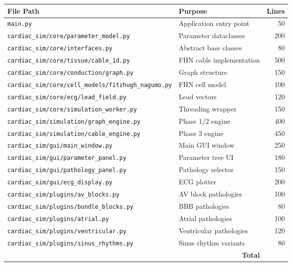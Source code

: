 \documentclass[12pt,a4paper,oneside]{book}
\begin{document}
\begin{center}
\begin{longtable}{|l|l|r|}
\hline
\textbf{File Path} & \textbf{Purpose} & \textbf{Lines} \\
\hline
\endhead
\hline
\endfoot
\texttt{main.py} & Application entry point & 50 \\
\texttt{cardiac\_sim/core/parameter\_model.py} & Parameter dataclasses & 200 \\
\texttt{cardiac\_sim/core/interfaces.py} & Abstract base classes & 80 \\
\texttt{cardiac\_sim/core/tissue/cable\_1d.py} & FHN cable implementation & 500 \\
\texttt{cardiac\_sim/core/conduction/graph.py} & Graph structure & 150 \\
\texttt{cardiac\_sim/core/cell\_models/fitzhugh\_nagumo.py} & FHN cell model & 100 \\
\texttt{cardiac\_sim/core/ecg/lead\_field.py} & Lead vectors & 120 \\
\texttt{cardiac\_sim/core/simulation\_worker.py} & Threading wrapper & 150 \\
\texttt{cardiac\_sim/simulation/graph\_engine.py} & Phase 1/2 engine & 400 \\
\texttt{cardiac\_sim/simulation/cable\_engine.py} & Phase 3 engine & 450 \\
\texttt{cardiac\_sim/gui/main\_window.py} & Main GUI window & 250 \\
\texttt{cardiac\_sim/gui/parameter\_panel.py} & Parameter tree UI & 180 \\
\texttt{cardiac\_sim/gui/pathology\_panel.py} & Pathology selector & 150 \\
\texttt{cardiac\_sim/gui/ecg\_display.py} & ECG plotter & 200 \\
\texttt{cardiac\_sim/plugins/av\_blocks.py} & AV block pathologies & 100 \\
\texttt{cardiac\_sim/plugins/bundle\_blocks.py} & BBB pathologies & 80 \\
\texttt{cardiac\_sim/plugins/atrial.py} & Atrial pathologies & 100 \\
\texttt{cardiac\_sim/plugins/ventricular.py} & Ventricular pathologies & 120 \\
\texttt{cardiac\_sim/plugins/sinus\_rhythms.py} & Sinus rhythm variants & 80 \\
\hline
\multicolumn{2}{|r|}{\textbf{Total}} & \approx 3500 \\
\hline
\end{longtable}
\end{center}
\end{document}

